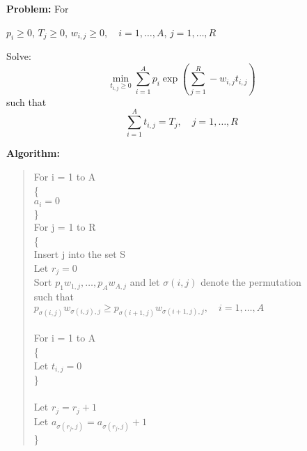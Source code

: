 


{\bf Problem:}
For 
\begin{center}
$p_i \ge 0$, $T_j\ge 0$, $w_{i,j}\ge 0, \quad i=1,\ldots,A$, $j=1,\ldots,R$
\end{center}

Solve:
$$
\min_{t_{i,j}\ge 0} \sum_{i=1}^A p_i\exp(\sum_{j=1}^R -w_{i,j}t_{i,j})
$$
\indent such that
$$\sum_{i=1}^A t_{i,j} = T_j, \quad j=1,\ldots,R$$


{\bf Algorithm:}
\begin{quote}
  For i = 1 to A\\
  \{\\
  \hbox{\hspace{5mm}}$a_i = 0$\\
  \}\\

  For j = 1 to R\\
  \{\\
     \hbox{\hspace{5mm}}Insert j into the set S\\
     \hbox{\hspace{5mm}}Let $r_j = 0$\\
     \hbox{\hspace{5mm}}Sort $p_1w_{1,j},\ldots,p_Aw_{A,j}$ and let $\sigma(i,j)$ denote the permutation\\
     \hbox{\hspace{5mm}}such that\\
     \hbox{\hspace{1cm}}$p_{\sigma(i,j)}w_{\sigma(i,j),j}\ge p_{\sigma(i+1,j)}w_{\sigma(i+1,j), j}, \quad i = 1,\ldots, A$\\\\
     \hbox{\hspace{5mm}}For i = 1 to A\\
     \hbox{\hspace{5mm}}\{\\
     \hbox{\hspace{10mm}}Let $t_{i,j} = 0$\\
     \hbox{\hspace{5mm}}\}\\\\
     \hbox{\hspace{5mm}}Let $r_j = r_j + 1$\\
     \hbox{\hspace{5mm}}Let $a_{\sigma(r_j,j)} = a_{\sigma(r_j,j)}+1$\\
  \}\\


\end{quote}
